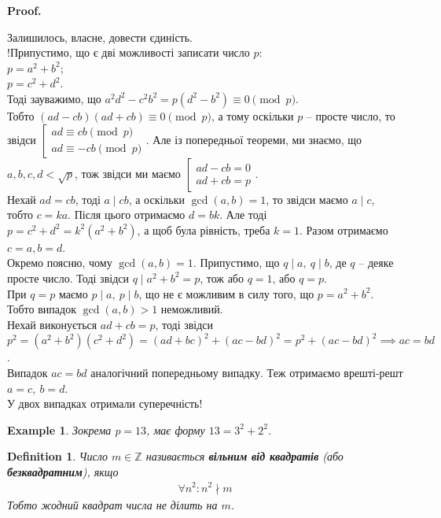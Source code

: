 \documentclass[a4paper, 10pt]{article}
\makeatletter
\theoremstyle{theoremdd}
\theoremstyle{theoremdd}
\newtheorem{definition}[theorem]{Definition}
\theoremstyle{theoremdd}
\theoremstyle{theoremdd}
\newtheorem{example}[theorem]{Example}
\theoremstyle{theoremdd}
\theoremstyle{theoremdd}
\theoremstyle{theoremdd}
\theoremstyle{theoremdd}
\renewenvironment{proof}[1][Proof.\\]{\par
\pushQED{\hfill \qed}%
\normalfont \topsep6\p@\@plus6\p@\relax
\trivlist
\item\relax
{\bfseries
#1\@addpunct{.}}\hspace\labelsep\ignorespaces
}{%
\popQED\endtrivlist\@endpefalse
}
\makeatother
\begin{document}
\begin{proof}
Залишилось, власне, довести єдиність.\\
!Припустимо, що є дві можливості записати число $p$:\\
$p = a^2+b^2$;\\
$p = c^2+d^2$.\\
Тоді зауважимо, що $a^2d^2-c^2b^2 = p(d^2-b^2) \equiv 0 \pmod p$.\\
Тобто $(ad-cb)(ad+cb) \equiv 0 \pmod p$, а тому оскільки $p$ -- просте число, то звідси $\left[ \begin{gathered} ad \equiv cb \pmod p \\ ad \equiv -cb \pmod p \end{gathered} \right.$. Але із попередньої теореми, ми знаємо, що $a,b,c,d < \sqrt{p}$, тож звідси ми маємо $\left[ \begin{gathered} ad - cb = 0 \\ ad + cb = p \end{gathered} \right.$.\\
Нехай $ad = cb$, тоді $a \mid cb$, а оскільки $\gcd(a,b) = 1$, то звідси маємо $a \mid c$, тобто $c = ka$. Після цього отримаємо $d = bk$. Але тоді\\
$p = c^2+d^2 = k^2(a^2+b^2)$, а щоб була рівність, треба $k = 1$. Разом отримаємо $c = a, b = d$.\\
Окремо поясню, чому $\gcd(a,b) = 1$. Припустимо, що $q \mid a,\ q \mid b$, де $q$ -- деяке просте число. Тоді звідси $q \mid a^2+b^2 = p$, тож або $q = 1$, або $q = p$.\\
При $q = p$ маємо $p \mid a,\ p \mid b$, що не є можливим в силу того, що $p = a^2+b^2$. Тобто випадок $\gcd(a,b) > 1$ неможливий.\\
Нехай виконується $ad+cb = p$, тоді звідси \\
$p^2 = (a^2+b^2)(c^2+d^2) = (ad+bc)^2+(ac-bd)^2 = p^2+(ac-bd)^2 \implies ac = bd$.\\
Випадок $ac = bd$ аналогічний попередньому випадку. Теж отримаємо врешті-решт $a = c,\ b = d$.\\
У двох випадках отримали суперечність!
\end{proof}

\begin{example}
Зокрема $p = 13$, має форму $13 = 3^2+2^2$.
\end{example}

\begin{definition}
\label{square_free}
Число $m \in \mathbb{Z}$ називається \textbf{вільним від квадратів} (або \textbf{безквадратним}), якщо
\begin{align*}
\forall n^2: n^2 \nmid m
\end{align*}
Тобто жодний квадрат числа не ділить на $m$.
\end{definition}
\end{document}
